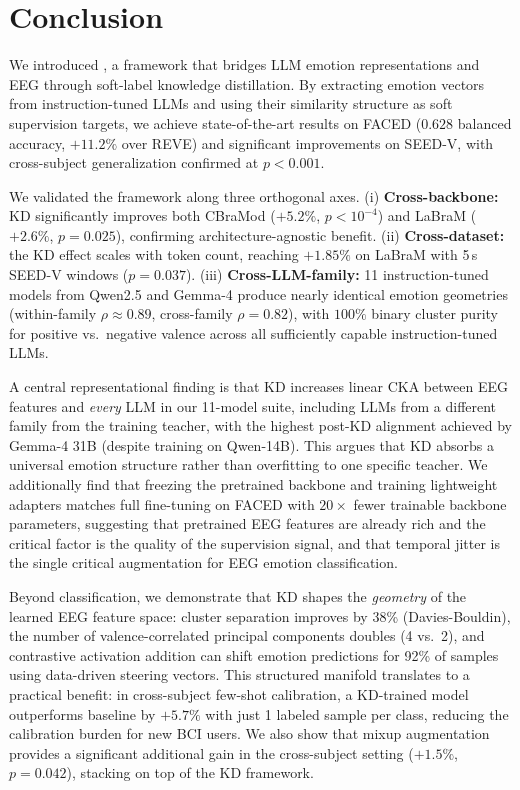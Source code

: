 \section{Conclusion}
\label{sec:conclusion}
\vspace{-1mm}

We introduced \ours, a framework that bridges LLM emotion representations and EEG through soft-label knowledge distillation. By extracting emotion vectors from instruction-tuned LLMs and using their similarity structure as soft supervision targets, we achieve state-of-the-art results on FACED ($\mathbf{0.628}$ balanced accuracy, $+11.2\%$ over REVE) and significant improvements on SEED-V, with cross-subject generalization confirmed at $p < 0.001$.

We validated the framework along three orthogonal axes. (i) \textbf{Cross-backbone:} KD significantly improves both CBraMod ($+5.2\%$, $p < 10^{-4}$) and LaBraM ($+2.6\%$, $p = 0.025$), confirming architecture-agnostic benefit. (ii) \textbf{Cross-dataset:} the KD effect scales with token count, reaching $+1.85\%$ on LaBraM with 5\,s SEED-V windows ($p = 0.037$). (iii) \textbf{Cross-LLM-family:} 11 instruction-tuned models from Qwen2.5 and Gemma-4 produce nearly identical emotion geometries (within-family $\rho \approx 0.89$, cross-family $\rho = 0.82$), with $100\%$ binary cluster purity for positive vs.\ negative valence across all sufficiently capable instruction-tuned LLMs.

A central representational finding is that KD increases linear CKA between EEG features and \emph{every} LLM in our 11-model suite, including LLMs from a different family from the training teacher, with the highest post-KD alignment achieved by Gemma-4 31B (despite training on Qwen-14B). This argues that KD absorbs a universal emotion structure rather than overfitting to one specific teacher. We additionally find that freezing the pretrained backbone and training lightweight adapters matches full fine-tuning on FACED with $20\times$ fewer trainable backbone parameters, suggesting that pretrained EEG features are already rich and the critical factor is the quality of the supervision signal, and that temporal jitter is the single critical augmentation for EEG emotion classification.

Beyond classification, we demonstrate that KD shapes the \emph{geometry} of the learned EEG feature space: cluster separation improves by 38\% (Davies-Bouldin), the number of valence-correlated principal components doubles (4 vs.\ 2), and contrastive activation addition can shift emotion predictions for 92\% of samples using data-driven steering vectors. This structured manifold translates to a practical benefit: in cross-subject few-shot calibration, a KD-trained model outperforms baseline by $+5.7\%$ with just 1 labeled sample per class, reducing the calibration burden for new BCI users. We also show that mixup augmentation provides a significant additional gain in the cross-subject setting ($+1.5\%$, $p = 0.042$), stacking on top of the KD framework.

